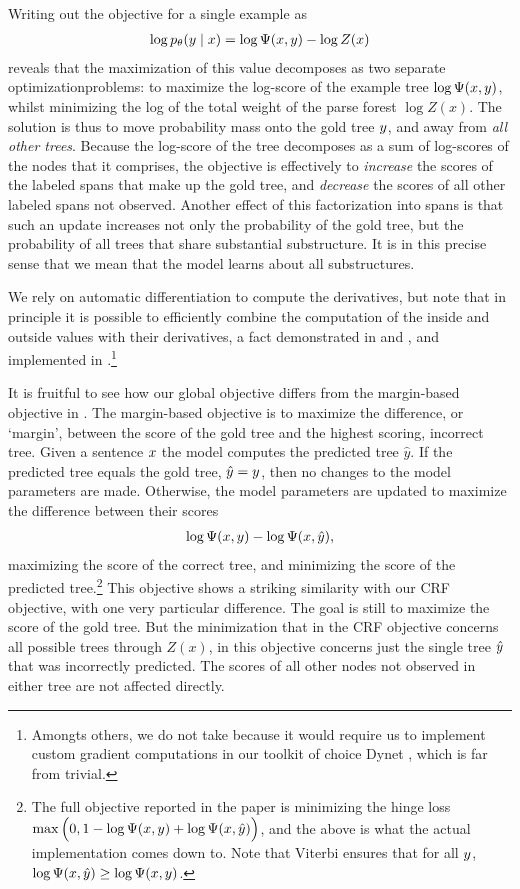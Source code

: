     Writing out the objective for a single example as
    \begin{align*}
      \log p_{\theta}(y \mid x) = \log \Psi(x, y) - \log Z(x)
    \end{align*}
    reveals that the maximization of this value decomposes as two separate optimizationproblems: to maximize the log-score of the example tree $\log \Psi(x, y)$, whilst minimizing the log of the total weight of the parse forest $\log Z(x)$. The solution is thus to move probability mass onto the gold tree $y$, and away from \textit{all other trees}. Because the log-score of the tree decomposes as a sum of log-scores of the nodes that it comprises, the objective is effectively to \textit{increase} the scores of the labeled spans that make up the gold tree, and \textit{decrease} the scores of all other labeled spans not observed. Another effect of this factorization into spans is that such an update increases not only the probability of the gold tree, but the probability of all trees that share substantial substructure. It is in this precise sense that we mean that the model learns about all substructures.

    We rely on automatic differentiation to compute the derivatives, but note that in principle it is possible to efficiently combine the computation of the inside and outside values with their derivatives, a fact demonstrated in \citep{eisner2009semirings} and \citep{eisner2016backprop}, and implemented in \citep{kim2017structured}.\footnote{Amongts others, we do not take because it would require us to implement custom gradient computations in our toolkit of choice Dynet \cite{neubig2017dynet}, which is far from trivial.}

    It is fruitful to see how our global objective differs from the margin-based objective in \citep{stern2017minimal}. The margin-based objective is to maximize the difference, or `margin', between the score of the gold tree and the highest scoring, incorrect tree. Given a sentence $x$ the model computes the predicted tree $\hat{y}$. If the predicted tree equals the gold tree, $\hat{y} = y$, then no changes to the model parameters are made. Otherwise, the model parameters are updated to maximize the difference between their scores
    \begin{align*}
      \log \Psi(x, y) - \log \Psi(x, \hat{y}),
    \end{align*}
    maximizing the score of the correct tree, and minimizing the score of the predicted tree.\footnote{The full objective reported in the paper is minimizing the hinge loss $\max \Big(0, 1 - \log \Psi(x, y) + \log \Psi(x, \hat{y}) \Big)$, and the above is what the actual implementation comes down to. Note that Viterbi ensures that for all $y$, $\log \Psi(x, \hat{y}) \geq \log \Psi(x, y)$.} This objective shows a striking similarity with our CRF objective, with one very particular difference. The goal is still to maximize the score of the gold tree. But the minimization that in the CRF objective concerns all possible trees through $Z(x)$, in this objective concerns just the single tree $\hat{y}$ that was incorrectly predicted. The scores of all other nodes not observed in either tree are not affected directly.

